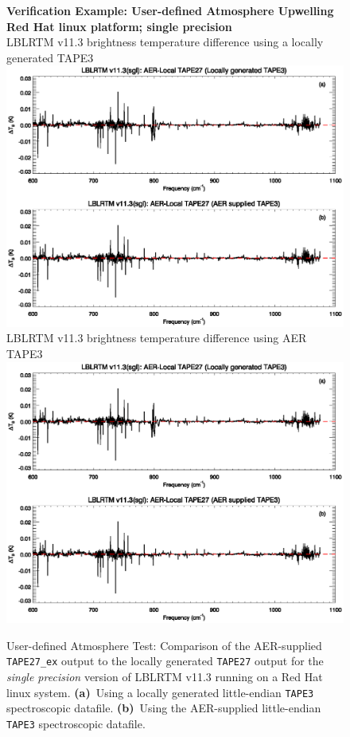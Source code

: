 \begin{figure}[htp]
  \centering
  \qquad\sffamily\textbf{Verification Example: User-defined Atmosphere Upwelling}\\
  \qquad\sffamily\textbf{Red Hat linux platform; single precision}\\
  \qquad\textsf{LBLRTM v11.3 brightness temperature difference using a locally generated TAPE3}\\
  \includegraphics[bb=85 403 534 558,clip,scale=1.0]{graphics/run_example_user_defined_upwelling/sgl.eps}
  \qquad\textsf{LBLRTM v11.3 brightness temperature difference using AER TAPE3}\\
  \includegraphics[bb=85 226 534 381,clip,scale=1.0]{graphics/run_example_user_defined_upwelling/sgl.eps}
  \caption{User-defined Atmosphere Test: Comparison of the AER-supplied \texttt{TAPE27\_ex} output to the locally generated \texttt{TAPE27} output for the \textsl{single precision} version of LBLRTM v11.3 running on a Red Hat linux system. \mbox{\textbf{(a)} Using} a locally generated little-endian \texttt{TAPE3} spectroscopic datafile. \mbox{\textbf{(b)} Using} the AER-supplied little-endian \texttt{TAPE3} spectroscopic datafile.}
  \label{fig:run_example_user_defined_upwelling-sgl}
\end{figure}

